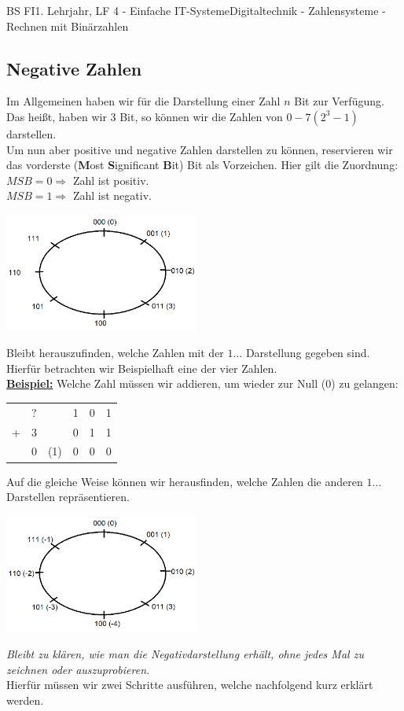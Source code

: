 \documentclass[11pt,twocolumn,oneside,openany,headings=optiontotoc,11pt,numbers=noenddot]{article}
\begin{document}
\begin{worksheet}{BS FI}{1. Lehrjahr, LF 4 - Einfache IT-Systeme}{Digitaltechnik - Zahlensysteme - Rechnen mit Binärzahlen}
		\subsection{Negative Zahlen}
		Im Allgemeinen haben wir für die Darstellung einer Zahl \(n\) Bit zur Verfügung. Das heißt, haben wir 3 Bit, so können wir die Zahlen von \(0 - 7 (2^3-1)\) darstellen.\\
		Um nun aber positive und negative Zahlen darstellen zu können, reservieren wir das vorderste (\textbf{M}ost \textbf{S}ignificant \textbf{B}it) Bit als Vorzeichen. Hier gilt die Zuordnung:\\
		\(MSB = 0 \Rightarrow\) Zahl ist positiv.\\
		\(MSB = 1 \Rightarrow\) Zahl ist negativ.\\
		\par\noindent
		\includegraphics[width=0.48\textwidth]{../99_Bilder/negZahlenkreisoZahlen.png}\\
		\par\noindent
		Bleibt herauszufinden, welche Zahlen mit der \(1\ldots\) Darstellung gegeben sind.\\
		Hierfür betrachten wir Beispielhaft eine der vier Zahlen.\\
		\textbf{\underline{Beispiel:}} Welche Zahl müssen wir addieren, um wieder zur Null (0) zu gelangen:\\
		\begin{tabularx}{0.48\textwidth}{rc|llll}
			 & ? & & 1 & 0 & 1\\
			 + & 3 & & 0 & 1 & 1\\
			 \cline{1-6}
			 & 0 & (1) & 0 & 0 & 0
		\end{tabularx}
		Auf die gleiche Weise können wir herausfinden, welche Zahlen die anderen \(1\dots\) Darstellen repräsentieren.\\
		\par\noindent
		\includegraphics[width=0.48\textwidth]{../99_Bilder/negZahlenkreis.png}\\
		\par\noindent
		\textit{Bleibt zu klären, wie man die Negativdarstellung erhält, ohne jedes Mal zu zeichnen oder auszuprobieren.}\\
		Hierfür müssen wir zwei Schritte ausführen, welche nachfolgend kurz erklärt werden.

\end{worksheet}
\end{document}
